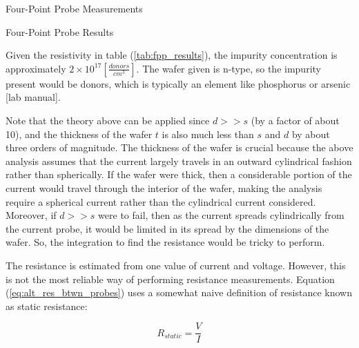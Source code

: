 
\FloatBarrier

\begin{table}[h!]
\centering
\caption{Four-Point Probe Measurements}
\label{tab:fpp_measure}
\end{table}

\FloatBarrier

\begin{table}[h!]
\centering
\caption{Four-Point Probe Results}
\label{tab:fpp_results}
\end{table}

\FloatBarrier

Given the resistivity in table (\ref{tab:fpp_results}), the impurity concentration is approximately $2 \times 10^{17} [\frac{donors}{cm^3}]$. The wafer given is n-type, so the impurity present would be donors, which is typically an element like phosphorus or arsenic [lab manual].

Note that the theory above can be applied since $d >> s$ (by a factor of about 10), and the thickness of the wafer $t$ is also much less than $s$ and $d$ by about three orders of magnitude. The thickness of the wafer is crucial because the above analysis assumes that the current largely travels in an outward cylindrical fashion rather than spherically. If the wafer were thick, then a considerable portion of the current would travel through the interior of the wafer, making the analysis require a spherical current rather than the cylindrical current considered. Moreover, if $d >> s$ were to fail, then as the current spreads cylindrically from the current probe, it would be limited in its spread by the dimensions of the wafer. So, the integration to find the resistance would be tricky to perform.%



The resistance is estimated from one value of current and voltage. However, this is not the most reliable way of performing resistance measurements.
Equation (\ref{eq:alt_res_btwn_probes}) uses a somewhat naive definition of resistance known as static resistance:

\begin{equation}
	\label{eq:static_res_def}
	R_{static} = \frac{V}{I}
\end{equation}

